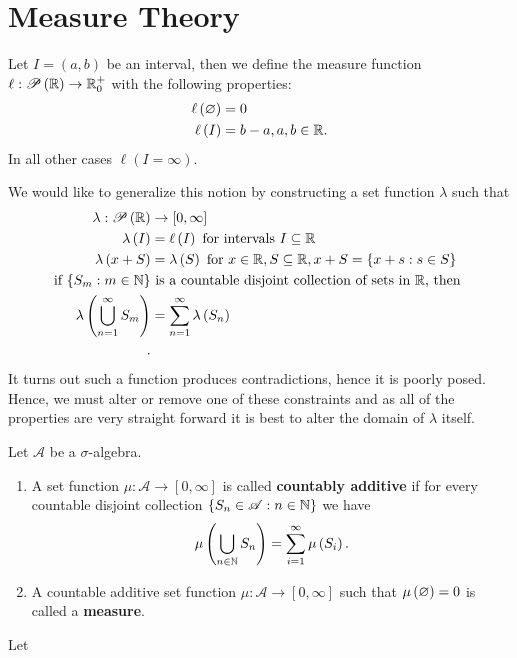 \section{Measure Theory}
\begin{definition}[Length]
	Let \(I = \left( a, b \right) \) be an interval, then we define the measure function \(\ell: \mathscr{P}\left( \mathbb{R} \right)  \to \mathbb{R}^{+}_{0}\) with the following properties:
	\begin{align*}
		\ell \left( \varnothing \right) &= 0\\
		\ell \left(  I  \right) &= b - a, a, b \in \mathbb{R}
	.\end{align*}
	In all other cases \(\ell \left( I = \infty \right) \).\\
\end{definition}
We would like to generalize this notion by constructing a set function \(\lambda\) such that
\begin{align*}
	\lambda:  \mathscr{P} \left( \mathbb{R} \right) &\to \left[ 0, \infty \right] \\
	\lambda\left( I \right) &= \ell\left( I \right) \text{ for intervals \(I \subseteq \ensuremath{\mathbb{R}}\)} \\
	\lambda\left( x + S \right) &=  \lambda\left( S \right) \text{ for \(x \in \ensuremath{\mathbb{R}}, S \subseteq \ensuremath{\mathbb{R}}, x + S = \{x + s : s \in S\} \)} \\
	\text{if } \{S_{m} : m \in \mathbb{N}\} &\text{ is a countable disjoint collection of sets in \(\ensuremath{\mathbb{R}}\), then }\\ \lambda\left( \bigcup_{n=1} ^{\infty} S_{m} \right) &=  \sum_{n=1}^{\infty} \lambda\left( S_{n} \right)  \\
.\end{align*}
It turns out such a function produces contradictions, hence it is poorly posed. Hence, we must alter or remove one of these constraints and as all of the properties are very straight forward it is best to alter the domain of \(\lambda\) itself.
\begin{definition}[Measure]
	Let \(\mathscr{A}\) be a \(\sigma\)-algebra.\\
	\begin{enumerate}
		\item A set function \(\mu: \mathscr{A}\to \left[ 0, \infty \right] \) is called \textbf{countably additive} if for every countable disjoint collection \(\{S_{n} \in \mathscr{A} : n \in \mathbb{N}\} \) we have \[
				\mu \left( \bigcup_{n \in \mathbb{N}} S_{n} \right)  = \sum_{i= 1}^{\infty} \mu \left( S_{i} \right)
		.\]
	\item A countable additive set function \(\mu: \mathscr{A} \to \left[ 0, \infty \right] \) such that \(\mu \left( \varnothing \right) = 0\) is called a \textbf{measure}.
	\end{enumerate}
\end{definition}
\begin{proposition}
	Let \(\)
\end{proposition}
